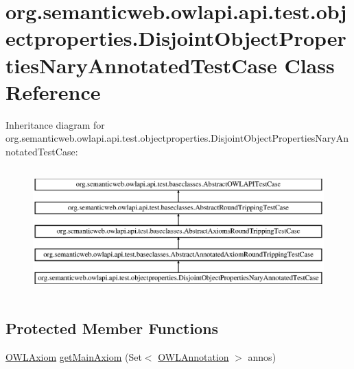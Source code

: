 \hypertarget{classorg_1_1semanticweb_1_1owlapi_1_1api_1_1test_1_1objectproperties_1_1_disjoint_object_properties_nary_annotated_test_case}{\section{org.\-semanticweb.\-owlapi.\-api.\-test.\-objectproperties.\-Disjoint\-Object\-Properties\-Nary\-Annotated\-Test\-Case Class Reference}
\label{classorg_1_1semanticweb_1_1owlapi_1_1api_1_1test_1_1objectproperties_1_1_disjoint_object_properties_nary_annotated_test_case}
}
Inheritance diagram for org.\-semanticweb.\-owlapi.\-api.\-test.\-objectproperties.\-Disjoint\-Object\-Properties\-Nary\-Annotated\-Test\-Case\-:\begin{figure}[H]
\begin{center}
\leavevmode
\includegraphics[height=4.903678cm]{classorg_1_1semanticweb_1_1owlapi_1_1api_1_1test_1_1objectproperties_1_1_disjoint_object_properties_nary_annotated_test_case}
\end{center}
\end{figure}
\subsection*{Protected Member Functions}
\begin{DoxyCompactItemize}
\item 
\hyperlink{interfaceorg_1_1semanticweb_1_1owlapi_1_1model_1_1_o_w_l_axiom}{O\-W\-L\-Axiom} \hyperlink{classorg_1_1semanticweb_1_1owlapi_1_1api_1_1test_1_1objectproperties_1_1_disjoint_object_properties_nary_annotated_test_case_a60f576ef39e63d0d486913cd5bfba24f}{get\-Main\-Axiom} (Set$<$ \hyperlink{interfaceorg_1_1semanticweb_1_1owlapi_1_1model_1_1_o_w_l_annotation}{O\-W\-L\-Annotation} $>$ annos)
\end{DoxyCompactItemize}
